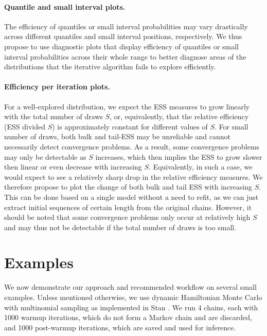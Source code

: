 \documentclass[american,]{article}
\let\oldparagraph\paragraph
\renewcommand{\paragraph}[1]{\oldparagraph{#1}\mbox{}}
\theoremstyle{definition}
\begin{document}
\hypertarget{quantile-and-small-interval-plots}{%
\paragraph{Quantile and small interval
plots.}\label{quantile-and-small-interval-plots}}
The efficiency of quantiles or small interval probabilities may vary
drastically across different quantiles and small interval positions,
respectively. We thus propose to use diagnostic plots that display
efficiency of quantiles or small interval probabilities across their
whole range to better diagnose areas of the distributions that the
iterative algorithm fails to explore efficiently.

\hypertarget{efficiency-change-plots}{%
\paragraph{Efficiency per iteration plots.}\label{efficiency-change-plots}}
For a well-explored distribution, we expect the ESS measures to grow
linearly with the total number of draws \(S\), or, equivalently, that
the relative efficiency (ESS divided \(S\)) is approximately constant
for different values of \(S\). For small number of draws, both bulk and
tail-ESS may be unreliable and cannot necessarily detect convergence
problems. As a result, some convergence problems may only be
detectable as \(S\) increases, which then implies the ESS to grow slower
then linear or even decrease with increasing \(S\). Equivalently, in
such a case, we would expect to see a relatively sharp drop in the
relative efficiency measures. We therefore propose to plot the change of
both bulk and tail ESS with increasing \(S\). This can be done based on
a single model without a need to refit, as we can just extract initial
sequences of certain length from the original chains. However, it should
be noted that some convergence problems only occur at relatively high
\(S\) and may thus not be detectable if the total number of draws is too
small.

\hypertarget{examples}{%
\section{Examples}\label{examples}}

We now demonstrate our approach and recommended workflow on several small examples.
Unless mentioned otherwise, we use dynamic Hamiltonian Monte Carlo with
multinomial sampling \citep{betancourt2017conceptual} as implemented
in Stan \citep{StanManual.2.18.0}. We run 4 chains, each with 1000
warmup iterations, which do not form a Markov chain and are discarded, and
1000 post-warmup iterations, which are saved and used for inference.
\end{document}
